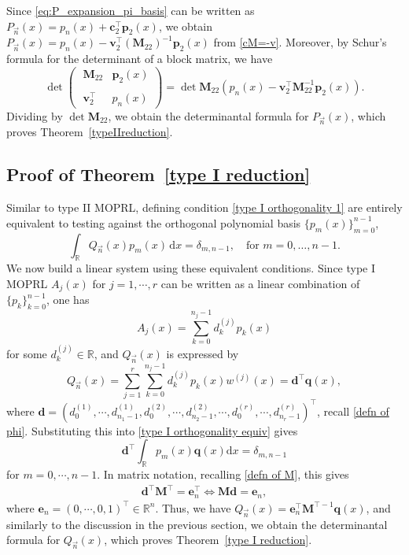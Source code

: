 \documentclass[a4paper,10pt,leqno]{amsart}
\numberwithin{equation}{section}
\theoremstyle{remark}
\newcommand{\dd}{\mathrm{d}}
\newcommand{\R}{\mathbb{R}}
\begin{document}
Since \eqref{eq:P_expansion_pi_basis} can be written as $P_{\vec{n}}(x) = p_n(x) + \bm{c}_2^\top \bm{p}_2(x) $, we obtain $ P_{\vec{n}}(x) = p_n(x) - \bm{v}_2^\top (\bm{M}_{22} )^{-1}  \bm{p}_2(x)$ from \eqref{cM=-v}. 
Moreover, by Schur's formula for the determinant of a block matrix, we have
\begin{equation}
\det
\begin{pmatrix}
\;\bm{M}_{22}  & \bm{p}_2(x) \\
 & \\
\;\bm{v}_2 ^\top & p_n(x)
\end{pmatrix} = \det\bm{M}_{22} \left( p_n(x) - \bm{v}_2^\top \bm{M}_{22}^{-1}\bm{p}_2(x)\right).
\end{equation}
Dividing by $\det \bm{M}_{22}$, we obtain the determinantal formula for $P_{\vec{n}}(x)$, which proves Theorem~\ref{typeIIreduction}.


\subsection{Proof of Theorem~\ref{type I reduction}}

Similar to type II MOPRL, defining condition \eqref{type I orthogonality 1} are entirely equivalent to testing against the orthogonal polynomial basis $ \{ p_m(x) \}_{m=0}^{n-1} $,
\begin{equation} \label{type I orthogonality equiv}
    \int_{\R} Q_{\vec{n}}(x) p_m(x) \, \dd x = \delta_{m, n-1}, \quad \text{for } m = 0, \dots, n-1.
\end{equation}
We now build a linear system using these equivalent conditions. 
Since type I MOPRL $A_j(x)$ for $j=1, \cdots, r$ can be written as a linear combination of $\{p_k\}_{k=0}^{n-1}$, one has
\[
A_j(x) = \sum_{k=0}^{n_j-1} d_k^{(j)} p_k(x)
\]
for some $d_k^{(j)} \in \R$, and $Q_{\vec{n}}(x)$ is expressed by
\begin{equation} \label{Q=dTphi}
    Q_{\vec{n}}(x) = \sum_{j=1}^{r} \sum_{k=0}^{n_j-1} d_k^{(j)} p_k(x) w^{(j)}(x) = \bm{d}^\top \bm{q}(x),
\end{equation}
where $\bm{d} = \left( d_0^{(1)}, \cdots, d_{n_1 - 1}^{(1)}, d_0^{(2)}, \cdots, d_{n_2 - 1}^{(2)}, \boldsymbol{\cdots}, d_0^{(r)}, \cdots, d_{n_r - 1}^{(r)} \right)^\top $, recall \eqref{defn of phi}.
Substituting this into \eqref{type I orthogonality equiv} gives
\begin{equation}
    \bm{d}^\top \int_{\R} p_m(x) \bm{q}(x) \dd x = \delta_{m, n-1}
\end{equation}
for $m = 0, \cdots, n-1$. In matrix notation, recalling \eqref{defn of M}, this gives
\begin{align}\label{Q system}
    \bm{d}^\top \bm{M}^\top = \bm{e}_n^\top \iff \bm{M} \bm{d} = \bm{e}_n,
\end{align}
where $\bm{e}_n = (0, \cdots, 0, 1)^\top \in \R^n$. 
Thus, we have $Q_{\vec{n}}(x) = \bm{e}_n^\top \bm{M}^{\top-1}  \bm{q}(x)$, and similarly to the discussion in the previous section, we obtain the determinantal formula for $Q_{\vec{n}}(x)$, which proves Theorem~\ref{type I reduction}.
\end{document}
